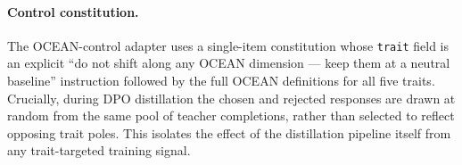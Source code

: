 \paragraph{Control constitution.}
The OCEAN-control adapter uses a single-item constitution whose
\texttt{trait} field is an explicit ``do not shift along any OCEAN
dimension --- keep them at a neutral baseline'' instruction followed by
the full OCEAN definitions for all five traits. Crucially, during DPO
distillation the chosen and rejected responses are drawn at random from
the same pool of teacher completions, rather than selected to reflect
opposing trait poles. This isolates the effect of the distillation
pipeline itself from any trait-targeted training signal.

\FloatBarrier
